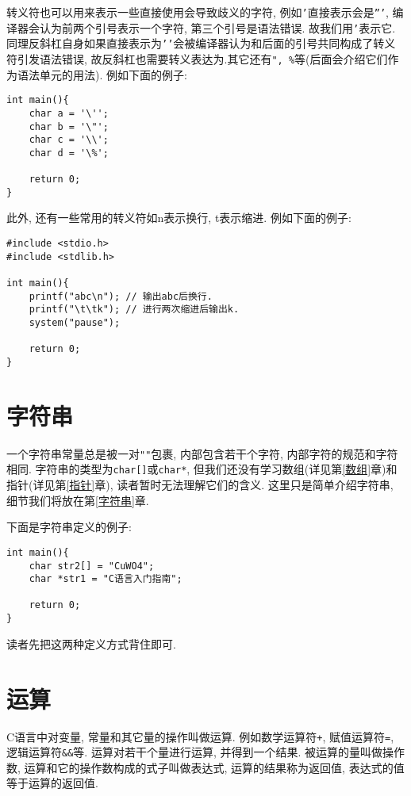         转义符也可以用来表示一些直接使用会导致歧义的字符, 例如\texttt{'}直接表示会是\texttt{'''}, 编译器会认为前两个引号表示一个字符, 第三个引号是语法错误. 故我们用\texttt{\sla'}表示它. 同理反斜杠自身如果直接表示为\texttt{'\sla'}会被编译器认为和后面的引号共同构成了转义符引发语法错误, 故反斜杠也需要转义表达为\texttt{\sla\sla}.其它还有\texttt{\sla", \sla\%}等(后面会介绍它们作为语法单元的用法). 例如下面的例子:
\begin{lstlisting}
int main(){
    char a = '\'';
    char b = '\"';
    char c = '\\';
    char d = '\%';

    return 0;
}
\end{lstlisting}

        此外, 还有一些常用的转义符如\sla n表示换行, \sla t表示缩进. 例如下面的例子:
\begin{lstlisting}
#include <stdio.h>
#include <stdlib.h>

int main(){
    printf("abc\n"); // 输出abc后换行.
    printf("\t\tk"); // 进行两次缩进后输出k.
    system("pause");

    return 0;
}
\end{lstlisting}

    \section{字符串}
        一个字符串常量总是被一对\texttt{""}包裹, 内部包含若干个字符, 内部字符的规范和字符相同. 字符串的类型为\texttt{char[]}或\texttt{char*}, 但我们还没有学习数组(详见第\ref{数组}章)和指针(详见第\ref{指针}章), 读者暂时无法理解它们的含义. 这里只是简单介绍字符串, 细节我们将放在第\ref{字符串}章.

        下面是字符串定义的例子:
\begin{lstlisting}
int main(){
    char str2[] = "CuWO4";
    char *str1 = "C语言入门指南";

    return 0;
}
\end{lstlisting}

        读者先把这两种定义方式背住即可.

    \section{运算} \label{运算}
        C语言中对变量, 常量和其它量的操作叫做运算. 例如数学运算符\texttt{+}, 赋值运算符\texttt{=}, 逻辑运算符\texttt{\&\&}等. 运算对若干个量进行运算, 并得到一个结果. 被运算的量叫做操作数, 运算和它的操作数构成的式子叫做表达式, 运算的结果称为返回值, 表达式的值等于运算的返回值.

